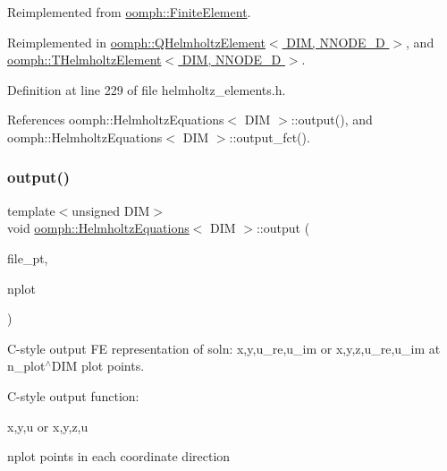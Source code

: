 Reimplemented from \hyperlink{classoomph_1_1FiniteElement_a72cddd09f8ddbee1a20a1ff404c6943e}{oomph\+::\+Finite\+Element}.



Reimplemented in \hyperlink{classoomph_1_1QHelmholtzElement_ac30733fd570c0f78f87ed4a7c542cc5a}{oomph\+::\+Q\+Helmholtz\+Element$<$ D\+I\+M, N\+N\+O\+D\+E\+\_\+D $>$}, and \hyperlink{classoomph_1_1THelmholtzElement_a43d1c573a4c51b9e146d5e9f767ea65c}{oomph\+::\+T\+Helmholtz\+Element$<$ D\+I\+M, N\+N\+O\+D\+E\+\_\+D $>$}.



Definition at line 229 of file helmholtz\+\_\+elements.\+h.



References oomph\+::\+Helmholtz\+Equations$<$ D\+I\+M $>$\+::output(), and oomph\+::\+Helmholtz\+Equations$<$ D\+I\+M $>$\+::output\+\_\+fct().

\mbox{\label{classoomph_1_1HelmholtzEquations_a0ba883cd70dbbd5664e76b83407f1144}} 
\subsubsection{\texorpdfstring{output()}{output()}\hspace{0.1cm}{\footnotesize\ttfamily [4/4]}}
{\footnotesize\ttfamily template$<$unsigned D\+IM$>$ \\
void \hyperlink{classoomph_1_1HelmholtzEquations}{oomph\+::\+Helmholtz\+Equations}$<$ D\+IM $>$\+::output (\begin{DoxyParamCaption}\item[{F\+I\+LE $\ast$}]{file\+\_\+pt,  }\item[{const unsigned \&}]{nplot }\end{DoxyParamCaption})\hspace{0.3cm}{\ttfamily [virtual]}}



C-\/style output FE representation of soln\+: x,y,u\+\_\+re,u\+\_\+im or x,y,z,u\+\_\+re,u\+\_\+im at n\+\_\+plot$^\wedge$\+D\+IM plot points. 

C-\/style output function\+:

x,y,u or x,y,z,u

nplot points in each coordinate direction 

